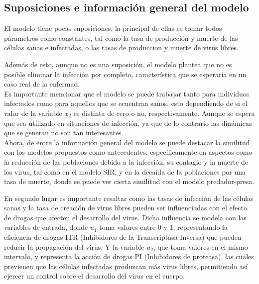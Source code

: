 \documentclass{article}
\begin{document}
    \subsection{Suposiciones e información general del modelo}

    El modelo tiene pocas suposiciones, la principal de ellas es tomar todos
    párametros como constantes, tal como la tasa de producción y muerte de las
    células sanas e infectadas, o las tasas de produccion y muerte de virus libres.

    Además de esto, aunque no es una suposición, el modelo plantea que no es
    posible eliminar la infección por completo, característica que se esperaría
    en un caso real de la enfermad.\\

    Es importante mencionar que el modelo se puede trabajar tanto para
    individuos infectados como para aquellos que se ecuentran sanos, esto dependiendo
    de si el valor de la variable $x_2$ es distinta de cero o no, respectivamente.
    Aunque se espera que sea utilizado en situaciones de infección, ya que de lo
    contrario las dinámicas que se generan no son tan interesantes.\\

    Ahora, de entre la información general del modelo se puede destacar
    la similitud con los modelos propuestos como antecedentes, específicamente
    en aspectos como la reducción de las poblaciones debido a la infección, su
    contagio y la muerte de los virus, tal como en el modelo SIR, y en la
    decaída de la poblaciones por una tasa de muerte, donde se puede ver cierta
    similitud con el modelo predador-presa.

    En segundo lugar es importante resaltar como las tasas de infección de las
    células sanas y la tasa de creación de virus libres pueden ser
    influenciadas con el efecto de drogas que afecten el desarrollo del virus.
    Dicha influencia se modela con las variables de entrada, donde $u_1$
    toma valores entre 0 y 1, representando la eficiencia de drogas ITR
    (Inhibidores de la Transcriptasa Inversa) que pueden reducir la propagación
    del virus. Y la variable $u_2$, que toma valores en el mismo intervalo, y
    representa la acción de drogas PI (Inhibidores de proteasa), las cuales
    previenen que las células infectadas produzcan más virus libres,
    permitiendo así ejercer un control sobre el desarrollo del virus en el
    cuerpo.\\
\end{document}
